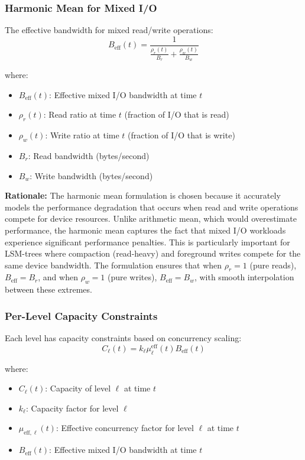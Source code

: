 \documentclass[11pt]{article}
\newcommand{\mueff}{\mu^{\text{eff}}}
\begin{document}
\subsubsection{Harmonic Mean for Mixed I/O}
The effective bandwidth for mixed read/write operations:
\begin{equation}
B_{\text{eff}}(t) = \frac{1}{\frac{\rho_r(t)}{B_r} + \frac{\rho_w(t)}{B_w}}
\end{equation}

where:
\begin{itemize}
    \item $B_{\text{eff}}(t)$: Effective mixed I/O bandwidth at time $t$
    \item $\rho_r(t)$: Read ratio at time $t$ (fraction of I/O that is read)
    \item $\rho_w(t)$: Write ratio at time $t$ (fraction of I/O that is write)
    \item $B_r$: Read bandwidth (bytes/second)
    \item $B_w$: Write bandwidth (bytes/second)
\end{itemize}

\textbf{Rationale:} The harmonic mean formulation is chosen because it accurately models the performance degradation that occurs when read and write operations compete for device resources. Unlike arithmetic mean, which would overestimate performance, the harmonic mean captures the fact that mixed I/O workloads experience significant performance penalties. This is particularly important for LSM-trees where compaction (read-heavy) and foreground writes compete for the same device bandwidth. The formulation ensures that when $\rho_r = 1$ (pure reads), $B_{\text{eff}} = B_r$, and when $\rho_w = 1$ (pure writes), $B_{\text{eff}} = B_w$, with smooth interpolation between these extremes.

\subsubsection{Per-Level Capacity Constraints}
Each level has capacity constraints based on concurrency scaling:
\begin{equation}
C_\ell(t) = k_\ell \mueff_\ell(t) B_{\text{eff}}(t)
\end{equation}

where:
\begin{itemize}
    \item $C_\ell(t)$: Capacity of level $\ell$ at time $t$
    \item $k_\ell$: Capacity factor for level $\ell$
    \item $\mu_{\text{eff},\ell}(t)$: Effective concurrency factor for level $\ell$ at time $t$
    \item $B_{\text{eff}}(t)$: Effective mixed I/O bandwidth at time $t$
\end{itemize}
\end{document}
